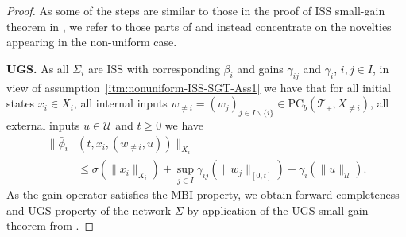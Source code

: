 \documentclass[twocolumn]{IEEEtran} %
\theoremstyle{definition}
\newcommand{\Uc}{\mathcal{U}}%
\newcommand{\PC}{\mathrm{PC}}%
\newcommand{\T}{\ensuremath{\mathcal{T}}}  %
\begin{document}
\begin{proof}
As some of the steps are similar to those in the proof of ISS small-gain theorem in \cite{MKG20}, we refer to those parts of 
\cite{MKG20} and instead concentrate on the novelties appearing in the non-uniform case.

\noindent\textbf{UGS.} 
As all $\Sigma_i$ are ISS with corresponding $\beta_i$ and gains $\gamma_{ij}$ and $\gamma_i$, $i,j\in I$, in view of 
assumption~\ref{itm:nonuniform-ISS-SGT-Ass1} we have that 
for all initial states $x_i \in X_i$, all internal inputs $w_{\neq i} = (w_j)_{j\in I \backslash \{i\}} \in \PC_b(\T_+,X_{\neq i})$, all external inputs $u \in \Uc$ and $t \geq 0$ we have
\begin{align*}
  \|\bar{\phi}_i&(t,x_i,(w_{\neq i},u))\|_{X_i} \\
	&\leq \sigma(\|x_i\|_{X_i}) + \sup_{j \in I}\gamma_{ij}(\|w_j\|_{[0,t]}) + \gamma_i(\|u\|_{\Uc}).%
\end{align*}
As the gain operator satisfies the MBI property, we obtain forward completeness and UGS property of the network $\Sigma$ by application of the UGS small-gain theorem from \cite[Theorem 1]{MKG20}.


\end{proof}
\end{document}
